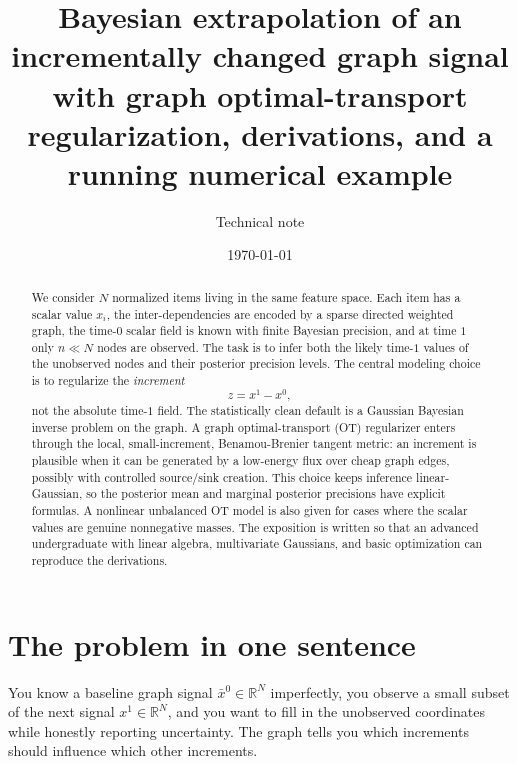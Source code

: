 \documentclass[11pt]{article}
\title{Bayesian extrapolation of an incrementally changed graph signal\\
\large with graph optimal-transport regularization, derivations, and a running numerical example}
\author{Technical note}
\date{\today}
\numberwithin{equation}{section}
\newcommand{\R}{\mathbb{R}}
\begin{document}
\maketitle

\begin{abstract}
We consider $N$ normalized items living in the same feature space.  Each item has a scalar value $x_i$, the inter-dependencies are encoded by a sparse directed weighted graph, the time-$0$ scalar field is known with finite Bayesian precision, and at time $1$ only $n\ll N$ nodes are observed.  The task is to infer both the likely time-$1$ values of the unobserved nodes and their posterior precision levels.  The central modeling choice is to regularize the \emph{increment}
\[
  z=x^1-x^0,
\]
not the absolute time-$1$ field.  The statistically clean default is a Gaussian Bayesian inverse problem on the graph.  A graph optimal-transport (OT) regularizer enters through the local, small-increment, Benamou-Brenier tangent metric: an increment is plausible when it can be generated by a low-energy flux over cheap graph edges, possibly with controlled source/sink creation.  This choice keeps inference linear-Gaussian, so the posterior mean and marginal posterior precisions have explicit formulas.  A nonlinear unbalanced OT model is also given for cases where the scalar values are genuine nonnegative masses.  The exposition is written so that an advanced undergraduate with linear algebra, multivariate Gaussians, and basic optimization can reproduce the derivations.
\end{abstract}

\tableofcontents

\section{The problem in one sentence}

You know a baseline graph signal $\bar x^0\in\R^N$ imperfectly, you observe a small subset of the next signal $x^1\in\R^N$, and you want to fill in the unobserved coordinates while honestly reporting uncertainty.  The graph tells you which increments should influence which other increments.
\end{document}
